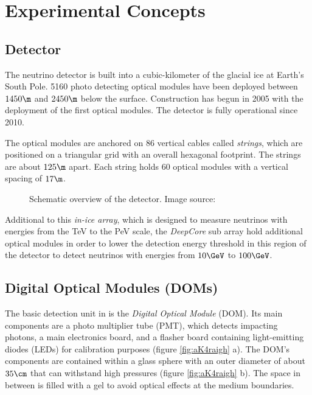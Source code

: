 
\section{Experimental Concepts}
\label{sec:experimental_background}

\subsection{\icecube Detector}

The \icecube neutrino detector is built into a cubic-kilometer of the glacial ice at Earth's South Pole. 5160 photo detecting optical modules have been deployed between $1450\m$ and $2450\m$ below the surface. Construction has begun in 2005 with the deployment of the first optical modules. The detector is fully operational since 2010. \cite{instrumentation}

The optical modules are anchored on 86 vertical cables called \textit{strings}, which are positioned on a triangular grid with an overall hexagonal footprint. The strings are about $125\m$ apart. Each string holds 60 optical modules with a vertical spacing of $17\m$. \cite{instrumentation}

\begin{figure}[htbp]
  \caption{Schematic overview of the \icecube detector. Image source: \cite{instrumentation}}
  \label{fig:aiThai0e}
\end{figure}

Additional to this \textit{in-ice array}, which is designed to measure neutrinos with energies from the TeV to the PeV scale, the \textit{DeepCore} sub array hold additional optical modules in order to lower the detection energy threshold in this region of the detector to detect neutrinos with energies from $10\GeV$ to $100\GeV$. \cite{instrumentation}


\subsection{Digital Optical Modules (DOMs)}
\label{sec:doms}

The basic detection unit in \icecube is the \textit{Digital Optical Module} (DOM).
Its main components are a photo multiplier tube (PMT), which detects impacting photons, a main electronics board, and a flasher board containing light-emitting diodes (LEDs) for calibration purposes (figure \ref{fig:aK4raigh} a). The DOM's components are contained within a glass sphere with an outer diameter of about $35\cm$ that can withstand high pressures (figure \ref{fig:aK4raigh} b). The space in between is filled with a gel to avoid optical effects at the medium boundaries. \cite{instrumentation}

